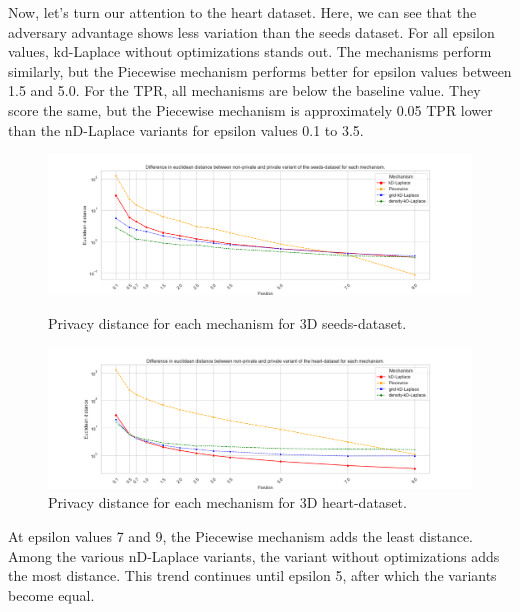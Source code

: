 {  Now, let's turn our attention to the heart dataset. Here, we can see that the adversary advantage shows less variation than the seeds dataset. For all epsilon values, kd-Laplace without optimizations stands out. The mechanisms perform similarly, but the Piecewise mechanism performs better for epsilon values between 1.5 and 5.0.
  For the TPR, all mechanisms are below the baseline value. They score the same, but the Piecewise mechanism is approximately 0.05 TPR lower than the nD-Laplace variants for epsilon values 0.1 to 3.5.
  \newpage
  \begin{figure}[H]
    \centering
    \begin{minipage}[c]{1\textwidth}
      \includegraphics[width=1\textwidth]{Results/RQ2/seeds-dataset/privacy_distance_plot.png}
      \caption{Privacy distance for each mechanism for 3D seeds-dataset.}
      \label{fig:privacy_seeds-dataset_comparison_3d_privacy_distance_plot}
    \end{minipage}
    \begin{minipage}[c]{1\textwidth}
      \includegraphics[width=1\textwidth]{Results/RQ2/heart-dataset/privacy_distance_plot.png}
      \caption{Privacy distance for each mechanism for 3D heart-dataset.}
      \label{fig:privacy_heart-dataset_comparison_3d_privacy_distance_plot}
    \end{minipage}
  \end{figure}
  At epsilon values 7 and 9, the Piecewise mechanism adds the least distance. Among the various nD-Laplace variants, the variant without optimizations adds the most distance.
  This trend continues until epsilon 5, after which the variants become equal.

}
